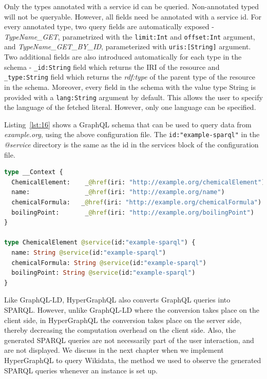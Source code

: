 Only the types annotated with a service id can be queried. Non-annotated typed will not be queryable. However, all fields need be annotated with a service id. For every annotated type, two query fields are automatically exposed - \textit{TypeName\_GET}, parametrized with the \texttt{limit:Int} and \texttt{offset:Int} argument, and \textit{TypeName\_GET\_BY\_ID}, parameterized with \texttt{uris:[String]} argument. Two additional fields are also introduced automatically for each type in the schema - \texttt{\_id:String} field which returns the IRI of the resource and \texttt{\_type:String} field which returns the \textit{rdf:type} of the parent type of the resource in the schema. Moreover, every field in the schema with the value type String is provided with a \texttt{lang:String} argument by default. This allows the user to specify the language of the fetched literal. However, only one language can be specified.

Listing~\ref{lst:16} shows a GraphQL schema that can be used to query data from \textit{example.org}, using the above configuration file. The \texttt{id:"example-sparql"} in the \textit{@service} directory is the same as the id in the services block of the configuration file.


\begin{minipage}{\linewidth}
\begin{lstlisting}[label=lst:16, caption={An example schema}, language=GraphQL]
type __Context {
  ChemicalElement:    _@href(iri: "http://example.org/chemicalElement")
  name:               _@href(iri: "http://example.org/name")
  chemicalFormula:   _@href(iri: "http://example.org/chemicalFormula")
  boilingPoint:       _@href(iri: "http://example.org/boilingPoint")
}

type ChemicalElement @service(id:"example-sparql") {
  name: String @service(id:"example-sparql")
  chemicalFormula: String @service(id:"example-sparql")
  boilingPoint: String @service(id:"example-sparql")
}
\end{lstlisting}
\end{minipage}

Like GraphQL-LD, HyperGraphQL also converts GraphQL queries into SPARQL. However, unlike GraphQL-LD where the conversion takes place on the client side, in HyperGraphQL the conversion takes place on the server side, thereby decreasing the computation overhead on the client side. Also, the generated SPARQL queries are not necessarily part of the user interaction, and are not displayed. We discuss in the next chapter when we implement HyperGraphQL to query Wikidata, the method we used to observe the generated SPARQL queries whenever an instance is set up.

